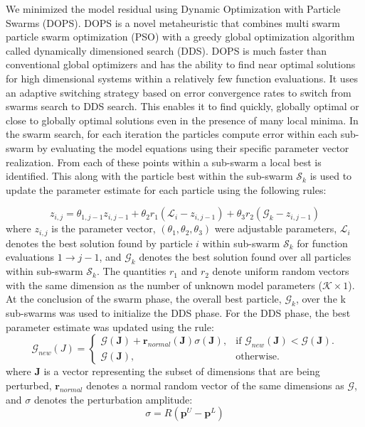 \documentclass[12pt]{article}
\begin{document}
We minimized the model residual using Dynamic Optimization with Particle Swarms (DOPS). DOPS is a novel metaheuristic that combines multi swarm particle swarm optimization (PSO) with a greedy global optimization algorithm called dynamically dimensioned search (DDS). DOPS is much faster than conventional global optimizers and has the ability to find near optimal solutions for high dimensional systems within a relatively few function evaluations. It uses an adaptive switching strategy based on error convergence rates to switch from swarms search to DDS search. This enables it to find quickly, globally optimal or close to globally optimal solutions even in the presence of many local minima. In the swarm search, for each iteration the particles compute error within each sub-swarm by evaluating the model equations using their specific parameter vector realization. From each of these points within a sub-swarm a local best is identified. This along with the particle best within the sub-swarm $\mathcal{S}_{k}$ is used to update the parameter estimate for each particle using the following rules:

\begin{equation}\label{eqn:update-rule}
	{z}_{i,j} = \theta_{1,j-1}{z}_{i,j-1} + \theta_{2}{r}_{1}\left(\mathcal{L}_{i} - {z}_{i,j-1}\right) + \theta_{3}{r}_{2}\left(\mathcal{G}_{k} - {z}_{i,j-1}\right)
\end{equation}
where ${z}_{i,j}$ is the parameter vector, $\left(\theta_{1},\theta_{2},\theta_{3}\right)$ were adjustable parameters, $\mathcal{L}_{i}$ denotes the best solution found by particle $i$ within sub-swarm
$\mathcal{S}_{k}$ for function evaluations $1\rightarrow j-1$, and
$\mathcal{G}_{k}$ denotes the best solution found over all particles within sub-swarm $\mathcal{S}_{k}$.
The quantities $r_{1}$ and $r_{2}$ denote uniform random vectors with the same dimension as the number of unknown model parameters ($\mathcal{K}\times{1}$).
At the conclusion of the swarm phase, the overall best particle, $\mathcal{G}_{k}$, over the k sub-swarms was used to initialize the DDS phase.
For the DDS phase, the best parameter estimate was updated using the rule:
\begin{equation}
  \mathcal{G}_{new}({J})=\begin{cases}
    \mathcal{G}(\mathbf{J})+\mathbf{r}_{normal}(\mathbf{J})\sigma(\mathbf{J}), & \text{if $\mathcal{G}_{new}(\mathbf{J})<\mathcal{G}(\mathbf{J})$}.\\
    \mathcal{G}(\mathbf{J}), & \text{otherwise}.
  \end{cases}
\end{equation}
where $\mathbf{J}$ is a vector representing the subset of dimensions that are being perturbed, $\mathbf{r}_{normal}$ denotes a normal random vector of the same dimensions as $\mathcal{G}$,
and $\sigma$ denotes the perturbation amplitude:
\begin{equation}
	\sigma = {R}(\mathbf{p}^U - \mathbf{p}^L)
\end{equation}
\end{document}
